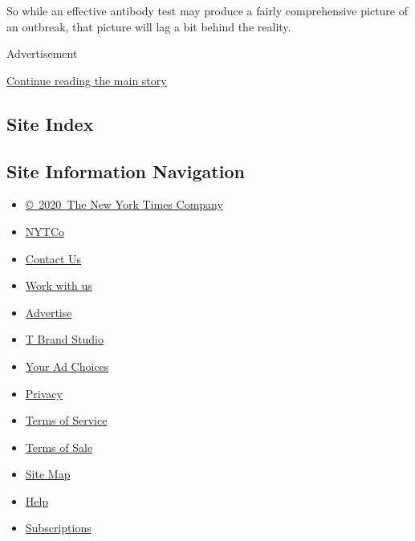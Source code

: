So while an effective antibody test may produce a fairly comprehensive
picture of an outbreak, that picture will lag a bit behind the reality.

Advertisement

\protect\hyperlink{after-bottom}{Continue reading the main story}

\hypertarget{site-index}{%
\subsection{Site Index}\label{site-index}}

\hypertarget{site-information-navigation}{%
\subsection{Site Information
Navigation}\label{site-information-navigation}}

\begin{itemize}
\tightlist
\item
  \href{https://help.nytimes3xbfgragh.onion/hc/en-us/articles/115014792127-Copyright-notice}{©~2020~The
  New York Times Company}
\end{itemize}

\begin{itemize}
\tightlist
\item
  \href{https://www.nytco.com/}{NYTCo}
\item
  \href{https://help.nytimes3xbfgragh.onion/hc/en-us/articles/115015385887-Contact-Us}{Contact
  Us}
\item
  \href{https://www.nytco.com/careers/}{Work with us}
\item
  \href{https://nytmediakit.com/}{Advertise}
\item
  \href{http://www.tbrandstudio.com/}{T Brand Studio}
\item
  \href{https://www.nytimes3xbfgragh.onion/privacy/cookie-policy\#how-do-i-manage-trackers}{Your
  Ad Choices}
\item
  \href{https://www.nytimes3xbfgragh.onion/privacy}{Privacy}
\item
  \href{https://help.nytimes3xbfgragh.onion/hc/en-us/articles/115014893428-Terms-of-service}{Terms
  of Service}
\item
  \href{https://help.nytimes3xbfgragh.onion/hc/en-us/articles/115014893968-Terms-of-sale}{Terms
  of Sale}
\item
  \href{https://spiderbites.nytimes3xbfgragh.onion}{Site Map}
\item
  \href{https://help.nytimes3xbfgragh.onion/hc/en-us}{Help}
\item
  \href{https://www.nytimes3xbfgragh.onion/subscription?campaignId=37WXW}{Subscriptions}
\end{itemize}
